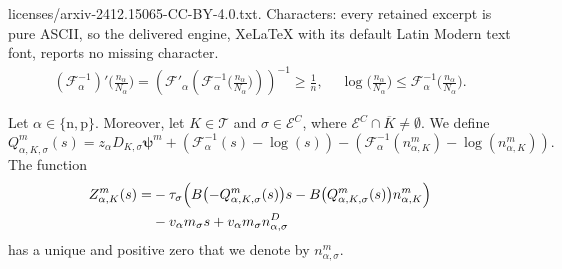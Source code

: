 \documentclass[10pt,a4paper]{amsart}
\def\electrons{\text{n}}
\def\holes{\text{p}}
\begin{document}
licenses/arxiv-2412.15065-CC-BY-4.0.txt. Characters: every retained excerpt is pure ASCII, so the delivered engine, XeLaTeX with its default Latin Modern text font, reports no missing character.
\begin{align} \label{eq:statistics-ineq}
        ( \mathcal{F}_\alpha^{-1} )' \bigl(\frac{n_\alpha}{N_\alpha} \bigr)
    = \left( \mathcal{F}'_\alpha \left( \mathcal{F}_\alpha^{-1} \bigl(\frac{n_\alpha}{N_\alpha} \bigr) \right) \right)^{-1} \geq \frac{1}{n},
    \quad
    ~
    \log\bigl(\frac{n_\alpha}{N_\alpha} \bigr) \leq\mathcal{F}_\alpha^{-1} \bigl(\frac{n_\alpha}{N_\alpha} \bigr).
\end{align}

\begin{lemma} \label{lem:Z-zero}
    Let $\alpha \in \{ \electrons, \holes \}$.
    Moreover, let $K \in \mathcal{T}$ and $\sigma \in \mathcal{E}^C$, where $\mathcal{E}^C \cap \overline{K} \neq \emptyset$.
    We define
    \begin{equation*}
        Q_{\alpha, K, \sigma}^m (s) = z_\alpha D_{K, \sigma} \boldsymbol{\psi}^m + \left( \mathcal{F}_\alpha^{-1}(s) - \log(s) \right) - \left(\mathcal{F}_\alpha^{-1}(n_{\alpha, K}^m) - \log(n_{\alpha, K}^m) \right).
    \end{equation*}
    The function
    \begin{equation*}
        \begin{split}
        Z_{\alpha, K}^m (s) =
        &- \tau_\sigma \Bigl(  B \bigl(-Q_{\alpha, K, \sigma}^m(s)\bigr) s - B\bigl(Q_{\alpha, K, \sigma}^m (s) \bigr) n_{\alpha, K}^m \Bigr)\\
        &- v_\alpha m_\sigma s + v_\alpha m_\sigma n_{\alpha, \sigma}^D
        \end{split}
    \end{equation*}
    has a unique and positive zero that we denote by $n_{\alpha, \sigma}^m$.
\end{lemma}
\end{document}
